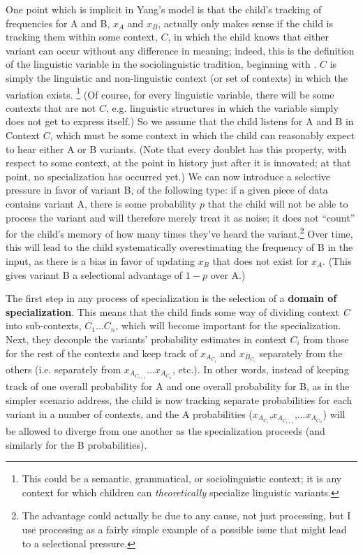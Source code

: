 One point which is implicit in Yang's model is that the child's tracking of frequencies for A and B, $x_A$ and $x_B$, actually only makes sense if the child is tracking them within some context, $C$, in which the child knows that either variant can occur without any difference in meaning; indeed, this is the definition of the linguistic variable in the sociolinguistic tradition, beginning with \citep{wlh1968}.
$C$ is simply the linguistic and non-linguistic context (or set of contexts) in which the variation exists.
\footnote{This could be a semantic, grammatical, or sociolinguistic context; it is any context for which children can \textsl{theoretically} specialize linguistic variants.}
(Of course, for every linguistic variable, there will be some contexts that are not $C$, e.g. linguistic structures in which the variable simply does not get to express itself.)
So we assume that the child listens for A and B in Context $C$, which must be some context in which the child can reasonably expect to hear either A or B variants.
(Note that every doublet has this property, with respect to some context, at the point in history just after it is innovated; at that point, no specialization has occurred yet.)
We can now introduce a selective pressure in favor of variant B, of the following type:
if a given piece of data contains variant A, there is some probability $p$ that the child will not be able to process the variant and will therefore merely treat it as noise; it does not ``count'' for the child's memory of how many times they've heard the variant.\footnote{The advantage could actually be due to any cause, not just processing, but I use processing as a fairly simple example of a possible issue that might lead to a selectional pressure.}
Over time, this will lead to the child systematically overestimating the frequency of B in the input, as there is a bias in favor of updating $x_B$ that does not exist for $x_A$.
(This gives variant B a selectional advantage of $1-p$ over A.)

The first step in any process of specialization is the selection of a \textbf{domain of specialization}. This means that the child finds some way of dividing context \textsl{C} into sub-contexts, $C_1$...$C_n$, which will become important for the specialization. Next, they decouple the variants' probability estimates in context $C_i$ from those for the rest of the contexts and keep track of $x_{A_{C_i}}$ and $x_{B_{C_i}}$ separately from the others (i.e. separately from $x_{A_{C_{i+1}}}$...$x_{A_{C_{n}}}$, etc.). In other words, instead of keeping track of one overall probability for A and one overall probability for B, as in the simpler scenario \citet{yang2000,2002} address, the child is now tracking separate probabilities for each variant in a number of contexts, and the A probabilities ($x_{A_{C_i}}$,$x_{A_{C_{i+1}}}$,...$x_{A_{C_n}}$) will be allowed to diverge from one another as the specialization proceeds (and similarly for the B probabilities).

